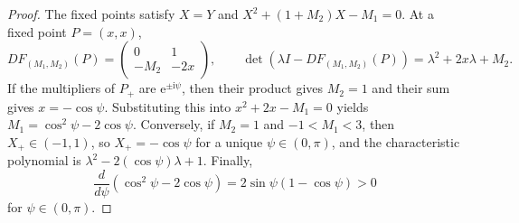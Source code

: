 \documentclass[10pt,a4paper]{amsart}
\begin{document}
\begin{proof}
The fixed points satisfy $X = Y$ and $X^2 + (1+M_2)X - M_1 = 0$. At a fixed point $P = (x,x)$,
\[
DF_{(M_1,M_2)}(P)
=
\begin{pmatrix}
0 & 1 \\
-M_2 & -2x
\end{pmatrix},
\qquad
\det(\lambda I - DF_{(M_1,M_2)}(P))
=
\lambda^2 + 2x\lambda + M_2.
\]
If the multipliers of $P_+$ are $\mathrm{e}^{\pm \mathrm{i}\psi}$, then their product gives $M_2 = 1$ and their sum gives $x = -\cos\psi$. Substituting this into $x^2 + 2x - M_1 = 0$ yields $M_1 = \cos^2\psi - 2\cos\psi$. Conversely, if $M_2 = 1$ and $-1 < M_1 < 3$, then $X_+ \in (-1,1)$, so $X_+ = -\cos\psi$ for a unique $\psi \in (0,\pi)$, and the characteristic polynomial is $\lambda^2 - 2(\cos\psi)\lambda + 1$. Finally,
\[
\frac{d}{d\psi}(\cos^2\psi - 2\cos\psi)
=
2\sin\psi(1 - \cos\psi) > 0
\]
for $\psi \in (0,\pi)$.
\end{proof}
\end{document}
